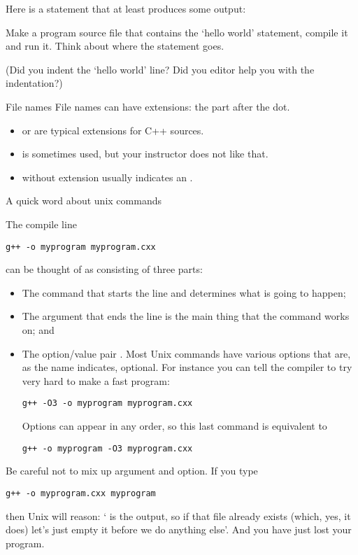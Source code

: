Here is a statement that at least produces some output:
%


\begin{exercise}
  Make a program source file that contains the `hello world'
  statement, compile it and run it. Think about where the statement goes.

  (Did you indent the `hello world' line? Did you editor help you with
  the indentation?)
\end{exercise}

\begin{block}{File names}
  \label{sl:file-ext}
  File names can have extensions: the part after the dot.
  \begin{itemize}
  \item {} or  are typical extensions for
    C++ sources.
  \item {} is sometimes used, but your instructor does
    not like that.
  \item {} without extension usually indicates an .
  \end{itemize}
\end{block}

 {A quick word about unix commands}

The compile line
\begin{verbatim}
g++ -o myprogram myprogram.cxx
\end{verbatim}
can be thought of as consisting of three parts:
\begin{itemize}
\item The command  that starts the line and determines what is
  going to happen;
\item The argument  that ends the line is the main
  thing that the command works on; and
\item The option/value pair . Most Unix commands have
  various options that are, as the name indicates, optional. For
  instance you can tell the compiler to try very hard to make a fast program:
\begin{verbatim}
g++ -O3 -o myprogram myprogram.cxx
\end{verbatim}
  Options can appear in any order, so this last command is equivalent to
\begin{verbatim}
g++ -o myprogram -O3 myprogram.cxx
\end{verbatim}
\end{itemize}
Be careful not to mix up argument and option. If you type
\begin{verbatim}
g++ -o myprogram.cxx myprogram
\end{verbatim}
then Unix will reason: ` is the output, so if that
file already exists (which, yes, it does) let's just empty it before
we do anything else'. And you have just lost your program.

